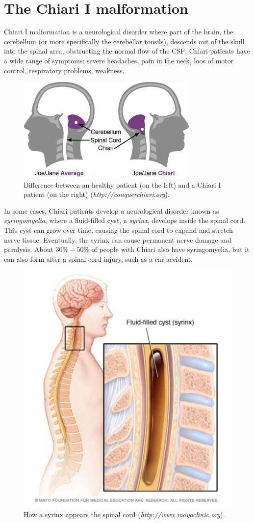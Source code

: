 \documentclass[a4paper,11pt,openright,twoside]{book}
\begin{document}
\section{The Chiari I malformation}
Chiari I malformation is a neurological disorder where part of the brain, the cerebellum (or more specifically the cerebellar tonsils), descends out of the skull into the spinal area, obstructing the normal flow of the CSF. Chiari patients have a wide range of symptoms: severe headaches, pain in the neck, loos of motor control, respiratory problems, weakness. 

\begin{figure}[h!]
\centering
\includegraphics[width=.6\textwidth]{images/chiari}
\caption{Difference between an healthy patient (on the left) and a Chiari I patient (on the right) (\emph{http://conquerchiari.org}).}
\label{img:cns:4}
\end{figure}

In some cases, Chiari patients develop a neurological disorder known as \emph{syringomyelia}, where a fluid-filled cyst, a \emph{syrinx}, develops inside the spinal cord. This cyst can grow over time, causing the spinal cord to expand and stretch nerve tissue. Eventually, the syrinx can cause permanent nerve damage and paralysis. About $30\%-50\%$ of people with Chiari also have syringomyelia, but it can also form after a spinal cord injury, such as a car accident.

\begin{figure}[h!]
\centering
\includegraphics[width=.6\textwidth]{images/syrinx}
\caption{How a syrinx appears the spinal cord (\emph{http://www.mayoclinic.org}).}
\label{img:cns:5}
\end{figure}
\end{document}
